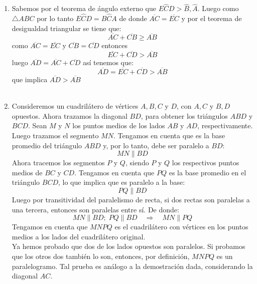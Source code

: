 \documentclass[10pt]{article}
\begin{document}
\begin{enumerate}

\item Sabemos por el teorema de ángulo externo que $E\widehat{C}D > \widehat{B}, \widehat{A}.$ Luego como $\triangle ABC$ por lo tanto $E\widehat{C}D=B\widehat{C}A$ de donde $\overline{AC}=\overline{EC}$ y por el teorema de desigualdad triangular se tiene que:
$$\overline{AC}+\overline{CB}\geq \overline{AB}$$ como $\overline{AC}=\overline{EC}$ y $\overline{CB}=\overline{CD}$ entonces $$\overline{EC} + \overline{CD} > \overline{AB}$$ luego $\overline{AD}=\overline{AC} + \overline{CD}$ así tenemos que:  $$\overline{AD}=\overline{EC} + \overline{CD} > \overline{AB}$$ que implica $\overline{AD}>\overline{AB}$\\\\

\item Consideremos un cuadrilátero de vértices $A, B, C$ y $D$, con $A, C$ y $B, D$ opuestos. Ahora trazamos  la diagonal $BD$, para obtener los triángulos $ABD$ y $BCD$.  Sean $M$ y $N$ los puntos medios de los lados $AB$ y $AD$, respectivamente. Luego trazamos el segmento $MN$. Tengamos en cuenta que es la base promedio del triángulo $ABD$ y, por lo tanto, debe ser paralelo a $BD$: $$MN \parallel BD$$
Ahora tracemos los segmentos $P$ y $Q$, siendo $P$ y $Q$ los respectivos puntos medios de $BC$ y $CD$. Tengamos en cuenta que $PQ$ es la base promedio en el triángulo $BCD$, lo que implica que es paralelo a la base:
$$PQ \parallel BD$$
Luego por  transitividad del paralelismo de recta, si dos rectas son paralelas a una tercera, entonces son paralelas entre sí. De donde: $$MN \parallel BD; \; PQ \parallel BD \quad \Rightarrow \quad MN \parallel PQ$$
Tengamos en cuenta que $MNPQ$ es el cuadrilátero con vértices en los puntos medios a los lados del cuadrilátero original. \\
Ya hemos probado que dos de los lados opuestos son paralelos. Si probamos que los otros dos también lo son, entonces, por definición, $MNPQ$ es un paralelogramo. Tal prueba es análogo a la demostración dada, considerando la diagonal $AC$.\\\\


\end{enumerate}
\end{document}
